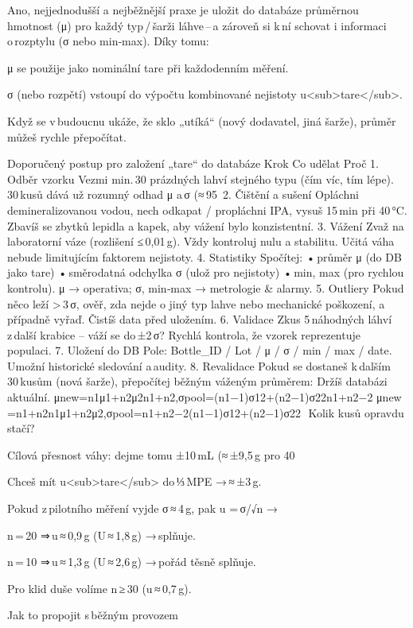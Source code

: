 Ano, nejjednodušší a nejběžnější praxe je uložit do databáze průměrnou hmotnost (μ) pro každý typ / šarži láhve – a zároveň si k ní schovat i informaci o rozptylu (σ nebo min‑max). Díky tomu:

    μ se použije jako nominální tare při každodenním měření.

    σ (nebo rozpětí) vstoupí do výpočtu kombinované nejistoty u<sub>tare</sub>.

    Když se v budoucnu ukáže, že sklo „utíká“ (nový dodavatel, jiná šarže), průměr můžeš rychle přepočítat.

Doporučený postup pro založení „tare“ do databáze
Krok	Co udělat	Proč
1. Odběr vzorku	Vezmi min. 30 prázdných lahví stejného typu (čím víc, tím lépe).	30 kusů dává už rozumný odhad μ a σ (≈ 95 %
2. Čištění a sušení	Opláchni demineralizovanou vodou, nech odkapat / propláchni IPA, vysuš 15 min při 40 °C.	Zbavíš se zbytků lepidla a kapek, aby vážení bylo konzistentní.
3. Vážení	Zvaž na laboratorní váze (rozlišení ≤ 0,01 g). Vždy kontroluj nulu a stabilitu.	Učitá váha nebude limitujícím faktorem nejistoty.
4. Statistiky	Spočítej:
• průměr μ (do DB jako tare)
• směrodatná odchylka σ (ulož pro nejistoty)
• min, max (pro rychlou kontrolu).	μ → operativa; σ, min‑max → metrologie & alarmy.
5. Outliery	Pokud něco leží > 3 σ, ověř, zda nejde o jiný typ lahve nebo mechanické poškození, a případně vyřaď.	Čistíš data před uložením.
6. Validace	Zkus 5 náhodných láhví z další krabice – váží se do ±2 σ?	Rychlá kontrola, že vzorek reprezentuje populaci.
7. Uložení do DB	Pole: Bottle_ID / Lot / μ / σ / min / max / date.	Umožní historické sledování a audity.
8. Revalidace	Pokud se dostaneš k dalším 30 kusům (nová šarže), přepočítej běžným váženým průměrem:	Držíš databázi aktuální.
μnew=n1μ1+n2μ2n1+n2,σpool=(n1−1)σ12+(n2−1)σ22n1+n2−2
μnew​=n1​+n2​n1​μ1​+n2​μ2​​,σpool​=n1​+n2​−2(n1​−1)σ12​+(n2​−1)σ22​​
​
Kolik kusů opravdu stačí?

    Cílová přesnost váhy: dejme tomu ±10 mL (≈ ±9,5 g pro 40 %

    Chceš mít u<sub>tare</sub> do ⅓ MPE → ≈ ±3 g.

    Pokud z pilotního měření vyjde σ ≈ 4 g, pak u = σ/√n →

        n = 20 ⇒ u ≈ 0,9 g (U ≈ 1,8 g) → splňuje.

        n = 10 ⇒ u ≈ 1,3 g (U ≈ 2,6 g) → pořád těsně splňuje.

        Pro klid duše volíme n ≥ 30 (u ≈ 0,7 g).

Jak to propojit s běžným provozem

